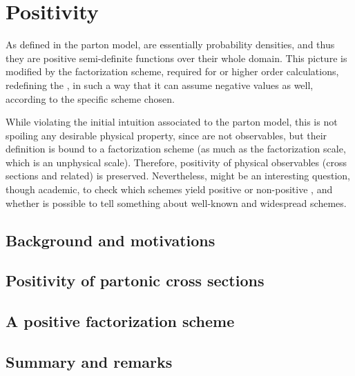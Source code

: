 
\chapter{Positivity}
\label{ch:pos}
\minitoc
\adjustmtc

As defined in the parton model, \pdfs are essentially probability densities,
and thus they are positive semi-definite functions over their whole domain.
%
This picture is modified by the factorization scheme, required for \nlo or
higher order calculations, redefining the \pdfs, in such a way that it can
assume negative values as well, according to the specific scheme chosen.

While violating the initial intuition associated to the parton model, this is
not spoiling any desirable physical property, since \pdfs are not observables,
but their definition is bound to a factorization scheme (as much as the
factorization scale, which is an unphysical scale).
Therefore, positivity of physical observables (cross sections and related) is
preserved. 
%
Nevertheless, might be an interesting question, though academic, to check which
schemes yield positive or non-positive \pdfs, and whether is possible to tell
something about well-known and widespread schemes.

\section{Background and motivations}
\label{sec:pos/motiv}


\section{Positivity of partonic cross sections}
\label{sec:pos/subtr}


\section{A positive factorization scheme}
\label{sec:pos/scheme}


\section{Summary and remarks}
\label{sec:pos/conc}


